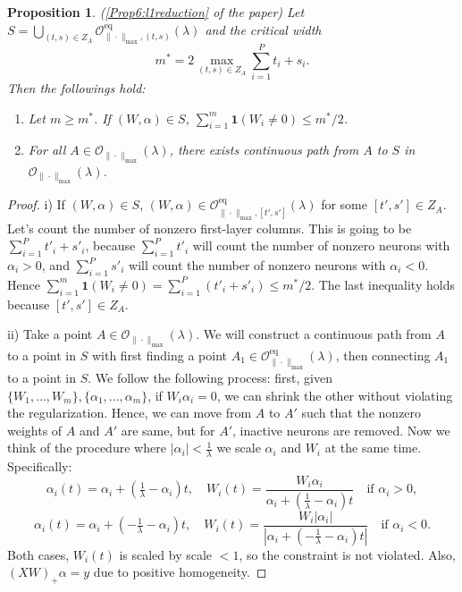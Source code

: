 \documentclass{article}
\newtheorem{proposition}{Proposition}[section]
\newcommand{\eq}{\mathrm{eq}}      %
\begin{document}
\begin{proposition}
\label{AppxProp6:l1reduction} (\cref{Prop6:l1reduction} of the paper)
Let $S = \bigcup_{(t,s) \in Z_A} \mathcal{O}_{\|\cdot\|_{\max}, (t,s)}^{\eq}(\lambda)$ and the critical width
\[
m^* = 2 \max_{(t,s) \in Z_A} \sum_{i=1}^P t_i + s_i.
\] Then the followings hold:
\begin{enumerate}
    \item[i)] Let $m \geq m^*$. If $(W, \alpha) \in S$, $\sum_{i=1}^m \mathbf{1}(W_i \neq 0) \leq m^*/2$.
    \item[ii)] For all $A \in \mathcal{O}_{\|\cdot\|_{\max}}(\lambda)$, there exists continuous path from $A$ to $S$ in $\mathcal{O}_{\|\cdot\|_{\max}}(\lambda)$.
\end{enumerate}
\end{proposition}
\begin{proof}
i) If $(W, \alpha) \in S$, $(W, \alpha) \in \mathcal{O}_{\|\cdot\|_{\max}, [t',s']}^{\eq}(\lambda)$ for some $[t',s'] \in Z_A$. Let's count the number of nonzero first-layer columns. This is going to be $\sum_{i=1}^P t'_i +s'_i$, because $\sum_{i=1}^{P} t'_i$ will count the number of nonzero neurons with $\alpha_i > 0$, and $\sum_{i=1}^{P} s'_i$ will count the number of nonzero neurons with $\alpha_i < 0$.
Hence $\sum_{i=1}^m \mathbf{1}(W_i \neq 0) = \sum_{i=1}^P (t'_i + s'_i) \leq m^*/2$. The last inequality holds because $[t',s'] \in Z_A$.

ii) Take a point $A \in \mathcal{O}_{\|\cdot\|_{\max}}(\lambda)$. We will construct a continuous path from $A$ to a point in $S$ with first finding a point $A_1 \in \mathcal{O}_{\|\cdot\|_{\max}}^{\eq}(\lambda)$, then connecting $A_1$ to a point in $S$.
We follow the following process: first, given $\{W_1, \dots, W_m\}, \{\alpha_1, \dots, \alpha_m\}$, if $W_i \alpha_i = 0$, we can shrink the other without violating the regularization. Hence, we can move from $A$ to $A'$ such that the nonzero weights of $A$ and $A'$ are same, but for $A'$, inactive neurons are removed.
Now we think of the procedure where $|\alpha_i| < \frac{1}{\lambda}$ we scale $\alpha_i$ and $W_i$ at the same time. Specifically:
\[\alpha_i(t) = \alpha_i + (\tfrac{1}{\lambda} - \alpha_i)t, \quad W_i(t) = \frac{W_i \alpha_i}{\alpha_i + (\tfrac{1}{\lambda} - \alpha_i)t} \quad \text{if } \alpha_i > 0,\]
\[\alpha_i(t) = \alpha_i + (-\tfrac{1}{\lambda} - \alpha_i)t, \quad W_i(t) = \frac{W_i |\alpha_i|}{|\alpha_i + (-\tfrac{1}{\lambda} - \alpha_i)t|} \quad \text{if } \alpha_i < 0.\]
Both cases, $W_i(t)$ is scaled by scale $ < 1$, so the constraint is not violated. Also, $(XW)_{+}\alpha = y$ due to positive homogeneity.


\end{proof}
\end{document}
